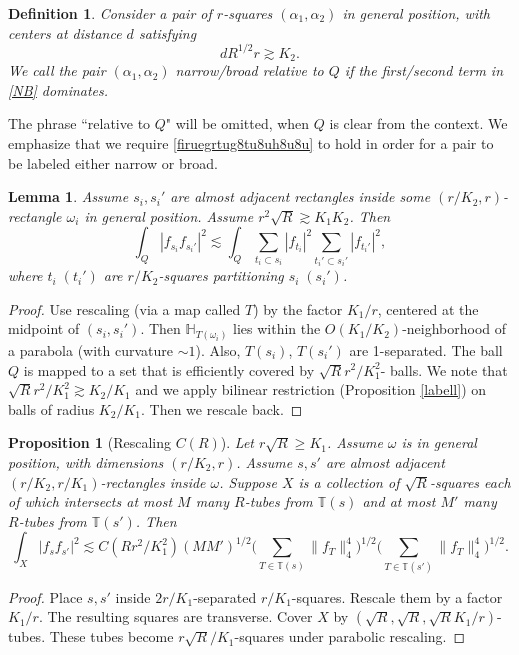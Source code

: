 \documentclass{amsart}%
\numberwithin{equation}{section}
\newtheorem{lemma}[theorem]{Lemma}
\newtheorem{proposition}[theorem]{Proposition}
\newtheorem{definition}[theorem]{Definition}
\newcommand{\ZT}{\mathbb{T}}
\newcommand{\ZH}{\mathbb{H}}
\newcommand{\1}{\mathbbm{1}}
\begin{document}
	\begin{definition}Consider a pair of $r$-squares $(\alpha_1,\alpha_2)$ in general position, with centers at distance $d$ satisfying 
	\begin{equation}
	\label{firuegrtug8tu8uh8u8u}
	dR^{1/2}r \gtrsim K_2.
	\end{equation}
		We call the pair $(\alpha_1,\alpha_2)$ narrow/broad relative to $Q$ if the first/second term in \eqref{NB} dominates.
	\end{definition}
	The phrase ``relative to $Q$" will be omitted, when $Q$ is clear from the context. We emphasize that we require \eqref{firuegrtug8tu8uh8u8u} to hold in order for a pair to be labeled either narrow or broad. 
	
	
	
	
	
	\begin{lemma}
		\label{procC}	
		Assume $s_i,s_i'$ are almost adjacent rectangles inside some $(r/K_2,r)$-rectangle $\omega_i$ in general position. Assume $r^2\sqrt{R}\gtrsim K_1K_2$. Then
		$$\int_{Q}|f_{s_i}f_{s_i'}|^2\lesssim \int_{Q}\sum_{t_i\subset s_i}|f_{t_i}|^2\sum_{t_i'\subset s_i'}|f_{t_i'}|^2,$$
		where $t_i \;(t_i')$ are $r/K_2$-squares  partitioning $s_i\; (s_i')$.		
	\end{lemma}
	\begin{proof}
	Use rescaling (via a map called  $T$) by the factor $K_1/r$, centered at the midpoint of $(s_i,s_i')$. Then $\ZH_{T(\omega_i)}$ lies within the $O(K_1/K_2)$-neighborhood of a parabola (with curvature $\sim 1$). Also, $T(s_i)$, $T(s_i')$ are 1-separated. The ball $Q$ is mapped to a set that is efficiently covered by $\sqrt{R}r^2/K_1^2$- balls. We note that $\sqrt{R}r^2/K_1^2\gtrsim K_2/K_1$ and we apply bilinear restriction (Proposition \ref{labell}) on balls of radius $K_2/K_1$. Then we rescale back.
    \qedhere
	  
	\end{proof}
	\begin{proposition}[Rescaling $C(R)$]
		\label{jijgutjhguthughru}
		Let $r\sqrt{R}\ge K_1$.
		Assume $\omega$ is in general position, with dimensions $(r/K_2,r)$.	
		Assume $s,s'$ are almost adjacent $(r/K_2,r/K_1)$-rectangles inside $\omega$. 
		Suppose $X$ is a collection of $\sqrt{R}$-squares each of which intersects at most $M$ many $R$-tubes from $\ZT(s)$ and at most $M'$ many $R$-tubes from $\ZT(s')$. Then	
		$$\int_X|f_{s}f_{s'}|^2\lesssim  C(Rr^2/K_1^2) (MM')^{1/2}\Big(\sum_{T\in\ZT(s)}\big\|f_{T}\big\|_4^4\Big)^{1/2}\Big(\sum_{T\in\ZT(s')}\big\|f_{T}\big\|_4^4\Big)^{1/2}.$$	
	\end{proposition}
	\begin{proof}
		Place $s,s'$ inside $2r/K_1$-separated $r/K_1$-squares. Rescale them by a factor $K_1/r$. The resulting squares are transverse.  Cover $X$ by $(\sqrt{R},\sqrt{R}, \sqrt{R}K_1/r)$- tubes. These tubes become $r\sqrt{R}/K_1$-squares under parabolic rescaling. 
	\end{proof}
    \smallskip 
\end{document}
